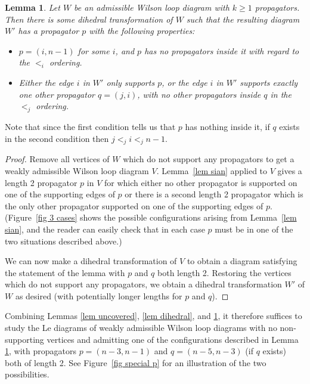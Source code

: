 \documentclass[11pt]{article}
\newtheorem{lem}[thm]{Lemma}
\theoremstyle{remark}
\theoremstyle{definition}
\begin{document}
\vspace{0.5em}


\begin{lem}\label{lem good p}
  Let $W$ be an admissible Wilson loop diagram with $k \geq 1$ propagators.  Then there is some dihedral transformation of $W$ such that the resulting diagram $W'$ has a propagator $p$ with the following properties:
  \begin{itemize}
  \item $p = (i, n-1)$ for some $i$, and $p$ has no propagators inside it with regard to the $<_i$ ordering.
  \item Either the edge $i$ in $W'$ only supports $p$, or the edge $i$ in $W'$ supports exactly one other propagator $q = (j,i)$, with no other propagators inside $q$ in the $<_j$ ordering. 
  \end{itemize}
\end{lem}
Note that since the first condition tells us that $p$ has nothing inside it, if $q$ exists in the second condition then $j<_ji<_jn-1$. 

\begin{proof}
  Remove all vertices of $W$ which do not support any propagators to get a weakly admissible Wilson loop diagram $V$.  Lemma~\ref{lem sian} applied to $V$ gives a length 2 propagator $p$ in $V$ for which either no other propagator is supported on one of the supporting edges of $p$ or there is a second length 2 propagator which is the only other propagator supported on one of the supporting edges of $p$.  (Figure~\ref{fig 3 cases} shows the possible configurations arising from Lemma~\ref{lem sian}, and the reader can easily check that in each case $p$ must be in one of the two situations described above.)

  We can now make a dihedral transformation of $V$ to obtain a diagram satisfying the statement of the lemma with $p$ and $q$ both length 2. Restoring the vertices which do not support any propagators, we obtain a dihedral transformation $W'$ of $W$ as desired (with potentially longer lengths for $p$ and $q$).
\end{proof}



Combining Lemmas \ref{lem uncovered}, \ref{lem dihedral}, and \ref{lem good p}, it therefore suffices to study the Le diagrams of weakly admissible Wilson loop diagrams with no non-supporting vertices and admitting one of the configurations described in Lemma \ref{lem good p}, with propagators $p = (n-3, n-1)$ and $q= (n-5, n-3)$ (if $q$ exists) both of length 2. See Figure~\ref{fig special p} for an illustration of the two possibilities. 
\end{document}
